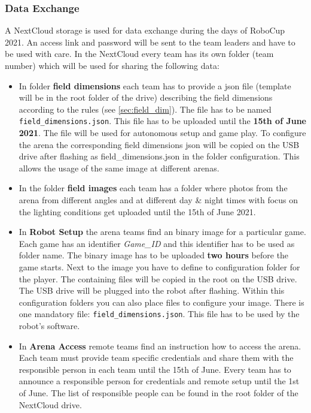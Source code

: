 \subsubsection{Data Exchange}
\label{sec:data_exchange}
A NextCloud storage is used for data exchange during the days of RoboCup 2021. An access link and password will be sent to the team leaders and have to be used with care. In the NextCloud every team has its own folder (team number) which will be used for sharing the following data:

\begin{itemize}
    \item In folder \textbf{field dimensions} each team has to provide a json file (template will be in the root folder of the drive) describing the field dimensions according to the rules (see \ref{sec:field_dim}). The file has to be named \texttt{field\_dimensions.json}. This file has to be uploaded until the \textbf{15th of June 2021}. The file will be used for autonomous setup and game play. To configure the arena the corresponding field dimensions json will be copied on the USB drive after flashing as field\_dimensions.json in the folder configuration. This allows the usage of the same image at different arenas.
    \item  In the folder \textbf{field images} each team has a folder where photos from the arena from different angles and at different day \& night times with focus on the lighting conditions get uploaded until the 15th of June 2021.
    \item In \textbf{Robot Setup} the arena teams find an binary image for a particular game. Each game has an identifier \textit{Game\_ID} and this identifier has to be used as folder name. The binary image has to be uploaded \textbf{two hours} before the game starts. Next to the image you have to define to configuration folder for the player. The containing files will be copied in the root on the USB drive. The USB drive will be plugged into the robot after flashing. Within this configuration folders you can also place files to configure your image. There is one mandatory file: \texttt{field\_dimensions.json}. This file has to be used by the robot's software.
    \item In \textbf{Arena Access} remote teams find an instruction how to access the arena. Each team must provide team specific credentials and share them with the responsible person in each team until the 15th of June. Every team has to announce a responsible person for credentials and remote setup until the 1st of June. The list of responsible people can be found in the root folder of the NextCloud drive.

\end{itemize}
